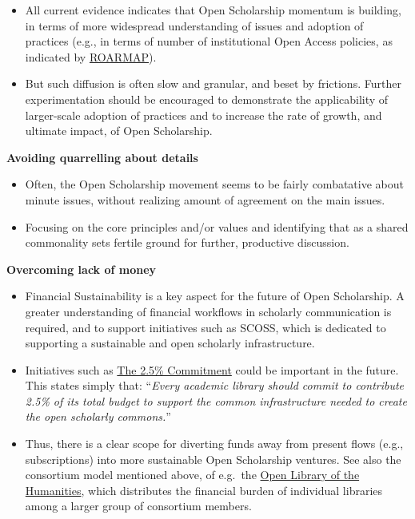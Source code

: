 \begin{itemize}
\tightlist
\item
  All current evidence indicates that Open Scholarship momentum is
  building, in terms of more widespread understanding of issues and
  adoption of practices (e.g., in terms of number of institutional Open
  Access policies, as indicated by
  \href{https://roarmap.eprints.org/dataviz2.html}{ROARMAP}).
\end{itemize}

\begin{itemize}
\tightlist
\item
  But such diffusion is often slow and granular, and beset by frictions.
  Further experimentation should be encouraged to demonstrate the
  applicability of larger-scale adoption of practices and to increase
  the rate of growth, and ultimate impact, of Open Scholarship.
\end{itemize}

\textbf{Avoiding quarrelling about details}

\begin{itemize}
\item
  Often, the Open Scholarship movement seems to be fairly combatative
  about minute issues, without realizing amount of agreement on the main
  issues.
\item
  Focusing on the core principles and/or values and identifying that as
  a shared commonality sets fertile ground for further, productive
  discussion.
\end{itemize}

\textbf{Overcoming lack of money}

\begin{itemize}
\item
  Financial Sustainability is a key aspect for the future of Open
  Scholarship. A greater understanding of financial workflows in
  scholarly communication is required, and to support initiatives such
  as SCOSS, which is dedicated to supporting a sustainable and open
  scholarly infrastructure.
\item
  Initiatives such as
  \href{https://intheopen.net/2017/09/join-the-movement-the-2-5-commitment/}{The
  2.5\% Commitment} could be important in the future. This states simply
  that: ``\emph{Every academic library should commit to contribute 2.5\%
  of its total budget to support the common infrastructure needed to
  create the open scholarly commons.}''
\item
  Thus, there is a clear scope for diverting funds away from present
  flows (e.g., subscriptions) into more sustainable Open Scholarship
  ventures. See also the consortium model mentioned above, of e.g.~the
  \href{https://www.openlibhums.org/site/about/the-olh-model/}{Open
  Library of the Humanities}, which distributes the financial burden of
  individual libraries among a larger group of consortium members.
\end{itemize}

